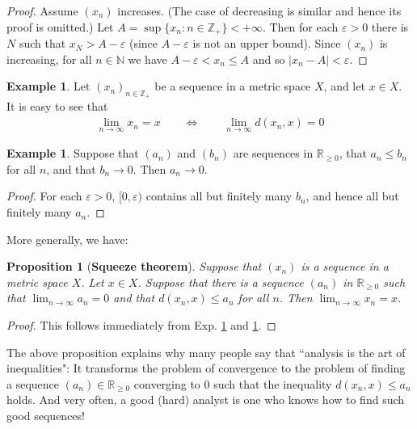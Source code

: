 \documentclass[12pt,b5paper,notitlepage]{article}
\theoremstyle{definition}
\newtheorem{eg}[df]{Example}
\theoremstyle{plain}
\newtheorem{pp}[df]{Proposition}
\newcommand{\Nbb}{\mathbb N}
\newcommand{\Zbb}{\mathbb Z}
\newcommand{\Rbb}{\mathbb R}
\newcommand{\dps}{\displaystyle}
\newcommand{\eps}{\varepsilon}
\numberwithin{equation}{section}
\begin{document}
\begin{proof}
Assume $(x_n)$ increases. (The case of decreasing is similar and hence its proof is omitted.) Let $A=\sup\{x_n:n\in\Zbb_+\}<+\infty$. Then for each $\eps>0$ there is $N$ such that $x_N>A-\eps$ (since $A-\eps$ is not an upper bound). Since $(x_n)$ is increasing, for all $n\in\Nbb$ we have $A-\eps<x_n\leq A$ and so $|x_n-A|<\eps$.
\end{proof}



\begin{eg}\label{lb27}
Let $(x_n)_{n\in\Zbb_+}$ be a sequence in a metric space $X$, and let $x\in X$. It is easy to see that
\begin{align*}
\lim_{n\rightarrow\infty} x_n=x\qquad\Longleftrightarrow \qquad \lim_{n\rightarrow\infty} d(x_n,x)=0
\end{align*}
\end{eg}

\begin{eg}\label{lb28}
Suppose that $(a_n)$ and $(b_n)$ are sequences in $\Rbb_{\geq 0}$, that $a_n\leq b_n$ for all $n$, and that $b_n\rightarrow 0$. Then  $a_n\rightarrow 0$. 
\end{eg}
\begin{proof}
For each $\varepsilon>0$, $[0,\varepsilon)$ contains all but finitely many $b_n$, and hence all but finitely many $a_n$.
\end{proof}


More generally, we have:

\begin{pp}[\textbf{Squeeze theorem}]\label{lb29}
Suppose that $(x_n)$ is a sequence in a metric space $X$. Let $x\in X$. Suppose that there is a sequence $(a_n)$ in $\Rbb_{\geq 0}$ such that $\dps\lim_{n\rightarrow\infty}a_n=0$ and that $d(x_n,x)\leq a_n$ for all $n$. Then $\dps\lim_{n\rightarrow\infty} x_n=x$.
\end{pp}

\begin{proof}
This follows immediately from Exp. \ref{lb27} and \ref{lb28}.
\end{proof}

The above proposition explains why many people say that ``analysis is the art of inequalities": It transforms the problem of convergence to the problem of finding a sequence $(a_n)\in\Rbb_{\geq 0}$ converging to $0$ such that the inequality $d(x_n,x)\leq a_n$ holds. And very often, a good (hard) analyst is one who knows how to find such good sequences!
\end{document}
